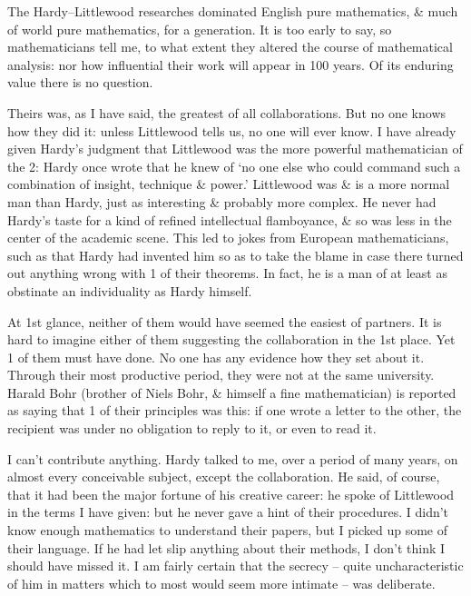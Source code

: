 \documentclass{article}
\numberwithin{equation}{section}
\begin{document}
The Hardy--Littlewood researches dominated English pure mathematics, \& much of world pure mathematics, for a generation. It is too early to say, so mathematicians tell me, to what extent they altered the course of mathematical analysis: nor how influential their work will appear in 100 years. Of its enduring value there is no question.

Theirs was, as I have said, the greatest of all collaborations. But no one knows how they did it: unless Littlewood tells us, no one will ever know. I have already given Hardy's judgment that Littlewood was the more powerful mathematician of the 2: Hardy once wrote that he knew of `no one else who could command such a combination of insight, technique \& power.' Littlewood was \& is a more normal man than Hardy, just as interesting \& probably more complex. He never had Hardy's taste for a kind of refined intellectual flamboyance, \& so was less in the center of the academic scene. This led to jokes from European mathematicians, such as that Hardy had invented him so as to take the blame in case there turned out anything wrong with 1 of their theorems. In fact, he is a man of at least as obstinate an individuality as Hardy himself.

At 1st glance, neither of them would have seemed the easiest of partners. It is hard to imagine either of them suggesting the collaboration in the 1st place. Yet 1 of them must have done. No one has any evidence how they set about it. Through their most productive period, they were not at the same university. Harald Bohr (brother of Niels Bohr, \& himself a fine mathematician) is reported as saying that 1 of their principles was this: if one wrote a letter to the other, the recipient was under no obligation to reply to it, or even to read it.

I can't contribute anything. Hardy talked to me, over a period of many years, on almost every conceivable subject, except the collaboration. He said, of course, that it had been the major fortune of his creative career: he spoke of Littlewood in the terms I have given: but he never gave a hint of their procedures. I didn't know enough mathematics to understand their papers, but I picked up some of their language. If he had let slip anything about their methods, I don't think I should have missed it. I am fairly certain that the secrecy -- quite uncharacteristic of him in matters which to most would seem more intimate -- was deliberate.
\end{document}
